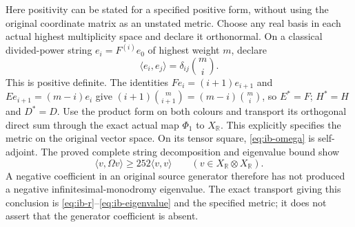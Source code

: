Here positivity can be stated for a specified positive form,
without using the original coordinate matrix as an unstated metric.
Choose any real basis in each actual highest multiplicity space
and declare it orthonormal. On a classical divided-power string
$e_i=F^{(i)}e_0$ of highest weight $m$, declare
\[
 \langle e_i,e_j\rangle=\delta_{ij}\binom mi.
\]
This is positive definite. The identities
$Fe_i=(i+1)e_{i+1}$ and $Ee_{i+1}=(m-i)e_i$ give
$(i+1)\binom m{i+1}=(m-i)\binom mi$, so $E^*=F$;
$H^*=H$ and $D^*=D$. Use the product form on both colours
and transport its orthogonal direct sum through the exact actual
map $\Phi_1$ to $X_{\mathbb R}$. This explicitly specifies the
metric on the original vector space. On its tensor square,
\eqref{eq:ib-omega} is self-adjoint. The proved complete string
decomposition and eigenvalue bound show
\[
 \langle v,\Omega v\rangle\ge252\langle v,v\rangle
 \qquad(v\in X_{\mathbb R}\otimes X_{\mathbb R}).
\]
A negative coefficient in an original source generator therefore
has not produced a negative infinitesimal-monodromy eigenvalue.
The exact transport giving this conclusion is
\eqref{eq:ib-r}--\eqref{eq:ib-eigenvalue} and the specified metric;
it does not assert that the generator coefficient is absent.

